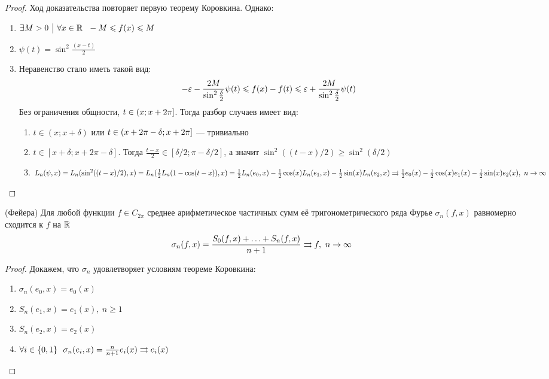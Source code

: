 \begin{proof}
	Ход доказательства повторяет первую теорему Коровкина. Однако:
	\begin{enumerate}
		\item $\exists M > 0 \ \big|\  \forall x \in \mathbb{R}\ \ -M \leqslant f(x) \leqslant M$
		
		\item $\psi(t) = \sin^2 \frac{(x - t)}{2}$
		
		\item Неравенство стало иметь такой вид:
		\[
			-\varepsilon - \frac{2M}{\sin^2 \frac{\delta}{2}} \psi(t) \leqslant f(x) - f(t) \leqslant \varepsilon + \frac{2M}{\sin^2 \frac{\delta}{2}} \psi(t)
		\]
		Без ограничения общности, $t \in \left(x; x + 2\pi\right]$. Тогда разбор случаев имеет вид:
		\begin{enumerate}
			\item $t \in (x; x + \delta)$ или $t \in \left(x + 2\pi - \delta; x + 2\pi\right]$ --- тривиально
			
			\item $t \in [x + \delta; x + 2\pi - \delta]$. Тогда $\frac{t - x}{2} \in [\delta / 2; \pi - \delta / 2]$, а значит $\sin^2((t - x) / 2) \ge \sin^2(\delta / 2)$
			
			\item \(L_n(\psi, x) = L_n(\sin^2((t - x) / 2), x) = L_n(\frac{1}{2}L_n(1 - \cos(t - x)), x) = \frac{1}{2}L_n(e_0, x) - \frac{1}{2}\cos(x)L_n(e_1, x) - \frac{1}{2}\sin(x)L_n(e_2, x) \rightrightarrows \frac{1}{2}e_0(x) - \frac{1}{2}\cos(x)e_1(x) - \frac{1}{2}\sin(x)e_2(x),\ n \to \infty\)
		\end{enumerate}
	\end{enumerate}
\end{proof}

\begin{theorem} (Фейера)
	Для любой функции $f \in C_{2\pi}$ среднее арифметическое частичных сумм её тригонометрического ряда Фурье $\sigma_n(f, x)$ равномерно сходится к $f$ на $\mathbb{R}$
	\[
		\sigma_n(f, x) = \frac{S_0(f, x) + \ldots + S_n(f, x)}{n + 1} \rightrightarrows f,\ n \to \infty
	\]
\end{theorem}

\begin{proof}
	Докажем, что $\sigma_n$ удовлетворяет условиям теореме Коровкина:
	\begin{enumerate}
		\item $\sigma_n(e_0, x) = e_0(x)$
		
		\item $S_n(e_1, x) = e_1(x),\ n \ge 1$
		
		\item $S_n(e_2, x) = e_2(x)$
		
		\item $\forall i \in \{0, 1\}\ \ \sigma_n(e_i, x) = \frac{n}{n + 1}e_i(x) \rra e_i(x)$
	\end{enumerate}
\end{proof}